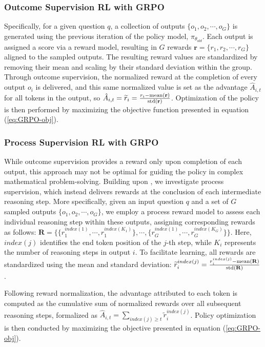 \begin{itemize}[topsep=0pt]
\begin{itemize}[topsep=0pt]
\subsubsection{Outcome Supervision RL with GRPO} Specifically, for a given question $q$, a collection of outputs $\{o_1, o_2, \cdots, o_G\}$ is generated using the previous iteration of the policy model, $\pi_{\theta_{old}}$. Each output is assigned a score via a reward model, resulting in $G$ rewards $\mathbf{r}=\{r_1, r_2, \cdots, r_G\}$ aligned to the sampled outputs. The resulting reward values are standardized by removing their mean and scaling by their standard deviation within the group. Through outcome supervision, the normalized reward at the completion of every output $o_i$ is delivered, and this same normalized value is set as the advantage $\hat{A}_{i, t}$ for all tokens in the output, so $\hat{A}_{i, t} = \widetilde{r}_i = \frac{r_i- {\rm mean}(\mathbf{r})}{{\rm std}(\mathbf{r})}$. Optimization of the policy is then performed by maximizing the objective function presented in equation (\ref{eq:GRPO-obj}).

\subsubsection{Process Supervision RL with GRPO} While outcome supervision provides a reward only upon completion of each output, this approach may not be optimal for guiding the policy in complex mathematical problem-solving. Building upon \cite{wang2023math}, we investigate process supervision, which instead delivers rewards at the conclusion of each intermediate reasoning step. More specifically, given an input question $q$ and a set of $G$ sampled outputs $\{o_1, o_2, \cdots, o_G\}$, we employ a process reward model to assess each individual reasoning step within these outputs, assigning corresponding rewards as follows: $\mathbf{R} = \{ \{r_1^{index(1)},\cdots,r_1^{index(K_1)}\}, \cdots,  \{r_G^{index(1)},\cdots,r_G^{index(K_G)}\} \}$. Here, $index(j)$ identifies the end token position of the $j$-th step, while $K_i$ represents the number of reasoning steps in output $i$. To facilitate learning, all rewards are standardized using the mean and standard deviation: $\widetilde{r}_i^{index(j)} = \frac{r_i^{index(j)} - {\rm mean(\mathbf{R})}}{{\rm std(\mathbf{R})}}$.

Following reward normalization, the advantage attributed to each token is computed as the cumulative sum of normalized rewards over all subsequent reasoning steps, formalized as $\hat{A}_{i, t} = \sum_{index(j) \ge t} \widetilde{r}_i^{index(j)}$. Policy optimization is then conducted by maximizing the objective presented in equation (\ref{eq:GRPO-obj}).


\end{itemize}
\end{itemize}
